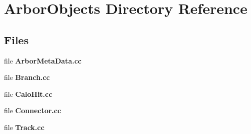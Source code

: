 \section{Arbor\+Objects Directory Reference}
\label{dir_91e2fd2758a1b0862e7829d7a145fc31}
\subsection*{Files}
\begin{DoxyCompactItemize}
\item 
file {\bf Arbor\+Meta\+Data.\+cc}
\item 
file {\bf Branch.\+cc}
\item 
file {\bf Calo\+Hit.\+cc}
\item 
file {\bf Connector.\+cc}
\item 
file {\bf Track.\+cc}
\end{DoxyCompactItemize}
